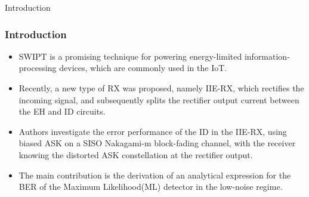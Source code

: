 \documentclass{beamer}
\begin{document}
\begin{section}{Introduction}
\begin{frame}
\frametitle{Introduction}
\begin{itemize}
    \item SWIPT is a promising technique for powering energy-limited information-processing devices, which are commonly used in the IoT.
    \item Recently, a new type of RX was proposed, namely IIE-RX, which rectifies the incoming signal, and subsequently splits the rectifier output current between the EH and ID circuits.
    \item Authors investigate the error performance of the ID in the IIE-RX, using biased ASK on a SISO Nakagami-m block-fading channel, with the receiver knowing the distorted ASK constellation at the rectifier output.
    \item The main contribution is the derivation of an analytical expression for the BER of the Maximum Likelihood(ML) detector in the low-noise regime.
\end{itemize}
\end{frame}
\end{section}
\end{document}
